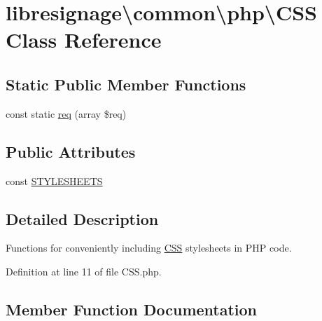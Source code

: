 \hypertarget{classlibresignage_1_1common_1_1php_1_1CSS}{}\section{libresignage\textbackslash{}common\textbackslash{}php\textbackslash{}C\+SS Class Reference}
\label{classlibresignage_1_1common_1_1php_1_1CSS}
\subsection*{Static Public Member Functions}
\begin{DoxyCompactItemize}
\item 
const static \hyperlink{classlibresignage_1_1common_1_1php_1_1CSS_a2841a5c19f4510514662d8aa5968246f}{req} (array \$req)
\end{DoxyCompactItemize}
\subsection*{Public Attributes}
\begin{DoxyCompactItemize}
\item 
const \hyperlink{classlibresignage_1_1common_1_1php_1_1CSS_ace19c98028bcef21f8366e786ff7bd05}{S\+T\+Y\+L\+E\+S\+H\+E\+E\+TS}
\end{DoxyCompactItemize}


\subsection{Detailed Description}
Functions for conveniently including \hyperlink{classlibresignage_1_1common_1_1php_1_1CSS}{C\+SS} stylesheets in P\+HP code. 

Definition at line 11 of file C\+S\+S.\+php.



\subsection{Member Function Documentation}
\mbox{\label{classlibresignage_1_1common_1_1php_1_1CSS_a2841a5c19f4510514662d8aa5968246f}} 
